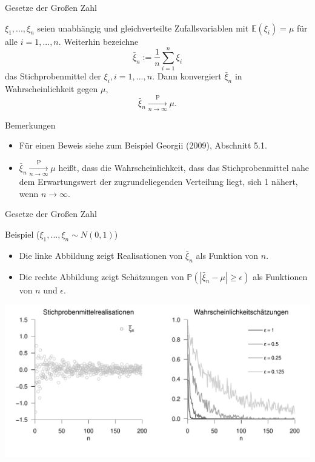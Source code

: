 \documentclass[
  8pt,
  ignorenonframetext,
]{beamer}
\providecommand{\tightlist}{%
  \setlength{\itemsep}{0pt}\setlength{\parskip}{0pt}}
\begin{document}
\begin{frame}{Gesetze der Großen Zahl}
\protect\hypertarget{gesetze-der-grouxdfen-zahl-2}{}
\small
\begin{theorem}
\justifying
\normalfont
$\xi_1,...,\xi_n$ seien unabhängig und gleichverteilte Zufallsvariablen mit 
$\mathbb{E}(\xi_i) = \mu$ für alle $i = 1,...,n$. Weiterhin bezeichne
\begin{equation}
\bar{\xi}_n := \frac{1}{n}\sum_{i=1}^n \xi_i
\end{equation}
das Stichprobenmittel der $\xi_i, i = 1,...,n$. Dann konvergiert $\bar{\xi}_n$ in
Wahrscheinlichkeit gegen $\mu$,
\begin{equation}
\bar{\xi}_n \xrightarrow[n \to \infty]{\mbox{P}} \mu.
\end{equation}
\end{theorem}

\footnotesize

Bemerkungen

\begin{itemize}
\tightlist
\item
  Für einen Beweis siehe zum Beispiel Georgii (2009), Abschnitt 5.1.
\item
  \(\bar{\xi}_n \xrightarrow[n\to\infty]{\mbox{P}} \mu\) heißt, dass die
  Wahrscheinlichkeit, dass das Stichprobenmittel nahe dem Erwartungswert
  der zugrundeliegenden Verteilung liegt, sich 1 nähert, wenn
  \(n\to\infty\).
\end{itemize}
\end{frame}

\begin{frame}{Gesetze der Großen Zahl}
\protect\hypertarget{gesetze-der-grouxdfen-zahl-3}{}
\vspace{2mm}

Beispiel (\(\xi_1,...,\xi_n \sim N(0,1)\)) \vspace{1mm} \footnotesize

\begin{itemize}
\item Die linke Abbildung zeigt Realisationen von $\bar{\xi}_n$ als Funktion von $n$.
\item Die rechte Abbildung zeigt Schätzungen von $\mathbb{P}(|\bar{\xi}_n - \mu| \ge \epsilon)$ 
als Funktionen von $n$ und $\epsilon$.
\end{itemize}

\begin{center}\includegraphics[width=0.95\linewidth]{7_Abbildungen/wtfi_7_schwaches_gesetz} \end{center}
\end{frame}
\end{document}
